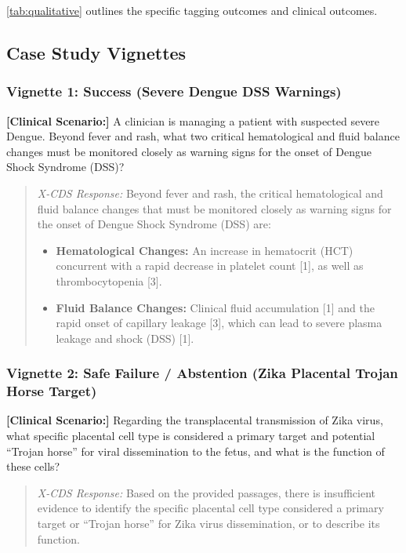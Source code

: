\cref{tab:qualitative} outlines the specific tagging outcomes and clinical outcomes.



\subsection{Case Study Vignettes}

\subsubsection{Vignette 1: Success (Severe Dengue DSS Warnings)}
\textbf{[Clinical Scenario:]} A clinician is managing a patient with suspected severe Dengue. Beyond fever and rash, what two critical hematological and fluid balance changes must be monitored closely as warning signs for the onset of Dengue Shock Syndrome (DSS)?

\begin{quote}
\small
\textit{X-CDS Response:} Beyond fever and rash, the critical hematological and fluid balance changes that must be monitored closely as warning signs for the onset of Dengue Shock Syndrome (DSS) are:
\begin{itemize}
    \item \textbf{Hematological Changes:} An increase in hematocrit (HCT) concurrent with a rapid decrease in platelet count [1], as well as thrombocytopenia [3].
    \item \textbf{Fluid Balance Changes:} Clinical fluid accumulation [1] and the rapid onset of capillary leakage [3], which can lead to severe plasma leakage and shock (DSS) [1].
\end{itemize}
\end{quote}

\subsubsection{Vignette 2: Safe Failure / Abstention (Zika Placental Trojan Horse Target)}
\textbf{[Clinical Scenario:]} Regarding the transplacental transmission of Zika virus, what specific placental cell type is considered a primary target and potential ``Trojan horse'' for viral dissemination to the fetus, and what is the function of these cells?

\begin{quote}
\small
\textit{X-CDS Response:} Based on the provided passages, there is insufficient evidence to identify the specific placental cell type considered a primary target or ``Trojan horse'' for Zika virus dissemination, or to describe its function.
\end{quote}

